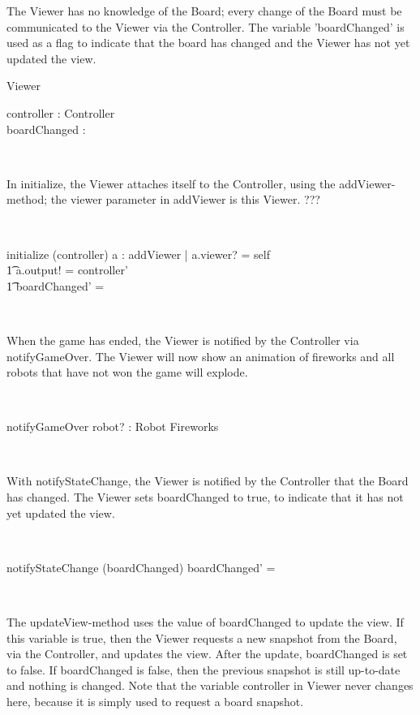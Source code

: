 \documentclass[12pt]{article}
\begin{document}
The Viewer has no knowledge of the Board; every change of the Board must be communicated to the Viewer via the Controller. The variable 'boardChanged' is used as a flag to indicate that the board has changed and the Viewer has not yet updated the view.
\begin{class}{Viewer}
\begin{state}
controller : Controller \\
boardChanged : \bool
\end{state}\\
\begin{classcom}
In initialize, the Viewer attaches itself to the Controller, using the addViewer-method; the viewer parameter in addViewer is this Viewer. ???
\end{classcom} \\
\begin{schema}{initialize}
\Delta (controller)
\where
\exists a : addViewer | a.viewer? = self \implies \\ \t1
a.output! = controller' \\ \t1
boardChanged' = \false
\end{schema}\\
\begin{classcom}
When the game has ended, the Viewer is notified by the Controller via notifyGameOver. The Viewer will now show an animation of fireworks and all robots that have not won the game will explode.
\end{classcom} \\
\begin{schema}{notifyGameOver}
robot? : Robot
\where
Fireworks
\end{schema}\\
\begin{classcom}
With notifyStateChange, the Viewer is notified by the Controller that the Board has changed. The Viewer sets boardChanged to true, to indicate that it has not yet updated the view.
\end{classcom} \\
\begin{schema}{notifyStateChange}
\Delta (boardChanged)
\where
boardChanged' = \true
\end{schema}\\
\znewpage
\begin{classcom}
The updateView-method uses the value of boardChanged to update the view. If this variable is true, then the Viewer requests a new snapshot from the Board, via the Controller, and updates the view. After the update, boardChanged is set to false. If boardChanged is false, then the previous snapshot is still up-to-date and nothing is changed. Note that the variable controller in Viewer never changes here, because it is simply used to request a board snapshot.

\end{classcom}
\end{class}
\end{document}
